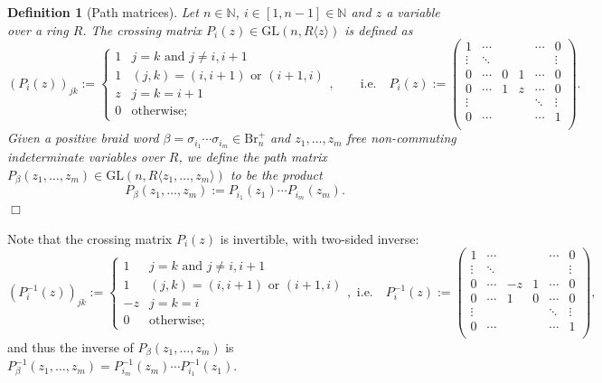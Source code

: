 \documentclass[11pt]{article}
\newtheorem{definition}[theorem]{Definition}
\begin{document}
\begin{definition}[Path matrices]\label{def:pathmatrix}
Let $n\in\mathbb{N}$, $i\in[1,n-1]\in\mathbb{N}$ and $z$ a variable over a ring $R$. The crossing matrix $P_i(z)\in \mbox{GL}(n,R\langle z\rangle)$ is defined as
$$
(P_i(z))_{jk} := \begin{cases} 1 & j=k \text{ and } j\neq i,i+1 \\
1 & (j,k) = (i,i+1) \text{ or } (i+1,i) \\
z & j=k=i+1 \\
0 & \text{otherwise;}
\end{cases},\qquad\mbox{i.e.}\quad
P_i(z):=\left(\begin{matrix}
1 & \cdots  & & & \cdots & 0\\
\vdots & \ddots & & & & \vdots\\
0 & \cdots & 0 & 1 & \cdots & 0\\
0 & \cdots & 1 & z & \cdots & 0\\
\vdots &  & & &\ddots & \vdots\\
0 & \cdots & & & \cdots & 1\\
\end{matrix}\right).
$$
Given a positive braid word $\beta=\sigma_{i_1}\cdots\sigma_{i_m} \in \mbox{Br}_{n}^{+}$  and $z_{1}, \dots, z_{m}$ free non-commuting indeterminate variables over $R$, we define the path matrix $P_{\beta}(z_1,\ldots,z_m)\in\mbox{GL}(n,R\langle z_1,\ldots,z_m\rangle)$ to be the product
$$
P_{\beta}(z_1,\ldots,z_m):=P_{i_1}(z_1)\cdots P_{i_m}(z_m).$$
\hfill$\Box$
\end{definition}

\noindent Note that the crossing matrix $P_i(z)$ is invertible, with two-sided inverse:
$$
(P_i^{-1}(z))_{jk} := \begin{cases} 1 & j=k \text{ and } j\neq i,i+1 \\
1 & (j,k) = (i,i+1) \text{ or } (i+1,i) \\
-z & j=k=i \\
0 & \text{otherwise;}
\end{cases},\mbox{ i.e.}\quad
P_i^{-1}(z):=\left(\begin{matrix}
1 & \cdots  & & & \cdots & 0\\
\vdots & \ddots & & & & \vdots\\
0 & \cdots & -z & 1 & \cdots & 0\\
0 & \cdots & 1 & 0 & \cdots & 0\\
\vdots &  & & &\ddots & \vdots\\
0 & \cdots & & & \cdots & 1\\
\end{matrix}\right),
$$
\noindent and thus the inverse of $P_{\beta}(z_1,\ldots,z_m)$ is $P^{-1}_{\beta}(z_1,\ldots,z_m)=P_{i_m}^{-1}(z_m)\cdots P_{i_1}^{-1}(z_1)$.
\end{document}
